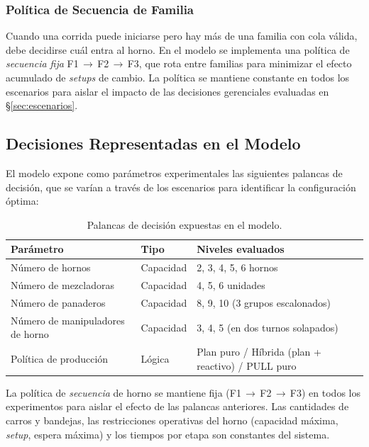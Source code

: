 \documentclass[10pt, a4paper]{article}
\begin{document}
\subsubsection{Pol\'itica de Secuencia de Familia}

Cuando una corrida puede iniciarse pero hay m\'as de una familia con cola
v\'alida, debe decidirse cu\'al entra al horno. En el modelo se implementa
una pol\'itica de \emph{secuencia fija} F1\,$\to$\,F2\,$\to$\,F3, que rota
entre familias para minimizar el efecto acumulado de \textit{setups} de
cambio. La pol\'itica se mantiene constante en todos los escenarios para
aislar el impacto de las decisiones gerenciales evaluadas en \S\ref{sec:escenarios}.

\subsection{Decisiones Representadas en el Modelo}

El modelo expone como par\'ametros experimentales las siguientes palancas de
decisi\'on, que se var\'ian a trav\'es de los escenarios para identificar la
configuraci\'on \'optima:

\begin{table}[H]
\centering
\caption{Palancas de decisi\'on expuestas en el modelo.}
\label{tab:palancas}
\renewcommand{\arraystretch}{1.25}
\begin{tabularx}{\textwidth}{>{\raggedright\arraybackslash}p{4.5cm}
                              >{\raggedright\arraybackslash}p{3.5cm} X}
\toprule
\rowcolor{azulClaro}
\textbf{Par\'ametro} & \textbf{Tipo} & \textbf{Niveles evaluados} \\
\midrule
N\'umero de hornos
  & Capacidad
  & 2, 3, 4, 5, 6 hornos \\
\rowcolor{grisClaro}
N\'umero de mezcladoras
  & Capacidad
  & 4, 5, 6 unidades \\
N\'umero de panaderos
  & Capacidad
  & 8, 9, 10 (3 grupos escalonados) \\
\rowcolor{grisClaro}
N\'umero de manipuladores de horno
  & Capacidad
  & 3, 4, 5 (en dos turnos solapados) \\
Pol\'itica de producci\'on
  & L\'ogica
  & Plan puro / H\'ibrida (plan + reactivo) / PULL puro \\
\bottomrule
\end{tabularx}
\end{table}

La pol\'itica de \emph{secuencia} de horno se mantiene fija
(F1\,$\to$\,F2\,$\to$\,F3) en todos los experimentos para aislar el efecto de
las palancas anteriores. Las cantidades de carros y bandejas, las
restricciones operativas del horno (capacidad m\'axima, \emph{setup}, espera
m\'axima) y los tiempos por etapa son constantes del sistema.
\end{document}
